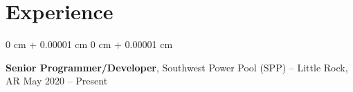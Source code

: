 \documentclass[10pt, letterpaper]{article}
\newenvironment{highlightsforbulletentries}{
    \begin{itemize}[
        topsep=0.10 cm,
        parsep=0.10 cm,
        partopsep=0pt,
        itemsep=0pt,
        leftmargin=10pt
    ]
}{
    \end{itemize}
} %
\newenvironment{onecolentry}{
    \begin{adjustwidth}{
        0 cm + 0.00001 cm
    }{
        0 cm + 0.00001 cm
    }
}{
    \end{adjustwidth}
} %
\newenvironment{twocolentry}[2][]{
    \onecolentry
    \def\secondColumn{#2}
    \setcolumnwidth{\fill, 4.5 cm}
    \begin{paracol}{2}
}{
    \switchcolumn \raggedleft \secondColumn
    \end{paracol}
    \endonecolentry
} %
\begin{document}
        \vspace{0.2 cm}
    
%
%
%
%
%
%
%
%

    \section{Experience}
    
        \begin{twocolentry}{
            May 2020 – Present
        }
            \textbf{Senior Programmer/Developer}, Southwest Power Pool (SPP) -- Little Rock, AR \end{twocolentry}
\end{document}
